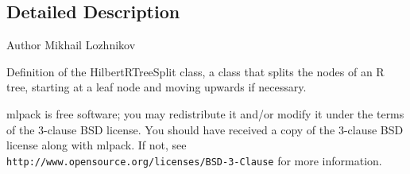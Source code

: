 \subsection{Detailed Description}
\begin{DoxyAuthor}{Author}
Mikhail Lozhnikov
\end{DoxyAuthor}
Definition of the Hilbert\+R\+Tree\+Split class, a class that splits the nodes of an R tree, starting at a leaf node and moving upwards if necessary.

mlpack is free software; you may redistribute it and/or modify it under the terms of the 3-\/clause B\+SD license. You should have received a copy of the 3-\/clause B\+SD license along with mlpack. If not, see {\tt http\+://www.\+opensource.\+org/licenses/\+B\+S\+D-\/3-\/\+Clause} for more information. 